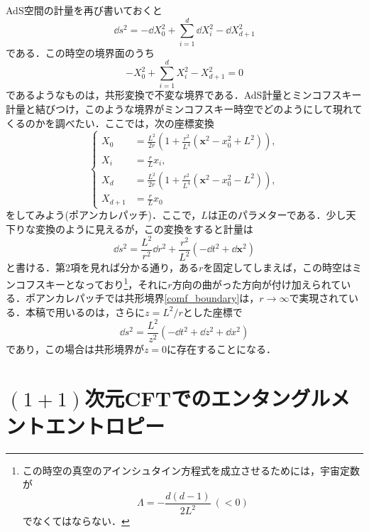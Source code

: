 \documentclass[a4paper,uplatex,dvipdfmx]{jsarticle}
\theoremstyle{definition}
\begin{document}
AdS空間の計量を再び書いておくと
\begin{equation}
  \dd s^2
  =
  -\dd X_{0}^{2}
  +
  \sum_{i=1}^{d}
  \dd X_{i}^{2}
  -
  \dd X_{d+1}^2
\end{equation}
である．この時空の境界面のうち
\begin{equation}
  -X_{0}^{2}
  +
  \sum_{i=1}^{d}
  X_{i}^{2}
  -
  X_{d+1}^2
  =
  0
  \label{comf_boundary}
\end{equation}
であるようなものは，共形変換で不変な境界である．AdS計量とミンコフスキー計量と結びつけ，このような境界がミンコフスキー時空でどのようにして現れてくるのかを調べたい．ここでは，次の座標変換
\begin{equation}
  \left\{
    \begin{alignedat}{1}
      X_{0}
      &=
      \frac{L^2}{2r}
      \left(  
        1
        +
        \frac{r^2}{L^4}(\bm{x}^2-x_{0}^{2}+L^2)
      \right)
      ,
      \\
      X_{i}
      &=
      \frac{r}{L}x_{i}
      ,
      \\
      X_{d}
      &=
      \frac{L^2}{2r}
      \left(  
        1+\frac{r^2}{L^4}(\bm{x}^2-x_{0}^2-L^2)
      \right)
      ,
      \\
      X_{d+1}
      &=
      \frac{r}{L}x_{0}
    \end{alignedat}
  \right.
\end{equation}
をしてみよう(ポアンカレパッチ)．ここで，$L$は正のパラメターである．少し天下りな変換のように見えるが，この変換をすると計量は
\begin{equation}
  \dd s^2
  =
  \frac{L^2}{r^2}\dd r^2
  +
  \frac{r^2}{L^2}(-\dd t^2+\dd \bm{x}^2)
\end{equation}
と書ける．第2項を見れば分かる通り，ある$r$を固定してしまえば，この時空はミンコフスキーとなっており\footnote{
  この時空の真空のアインシュタイン方程式を成立させるためには，宇宙定数が
  $$
    \Lambda
    =
    -
    \frac{d(d-1)}{2L^2}
    \ 
    (< 0)
  $$
  でなくてはならない．
}，それに$r$方向の曲がった方向が付け加えられている．ポアンカレパッチでは共形境界\eqref{comf_boundary}は，$r\rightarrow\infty$で実現されている．本稿で用いるのは，さらに$z=L^2/r$とした座標で
\begin{equation}
  \dd s^2
  =
  \frac{L^2}{z^2}(-\dd t^2+\dd z^2+\dd x^2)
  \label{AdS_metric_tzx}
\end{equation}
であり，この場合は共形境界が$z=0$に存在することになる．


\section{\texorpdfstring{$(1+1)$}{(1+1)}次元CFTでのエンタングルメントエントロピー}
\end{document}
